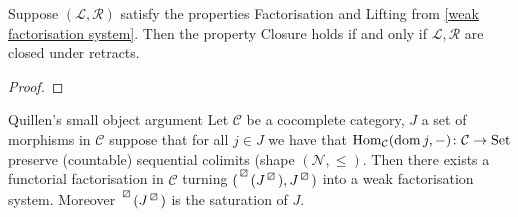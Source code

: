 \begin{lem}
    Suppose $(\mathcal{L}, \mathcal{R})$ satisfy the properties Factorisation and Lifting from \cref{weak factorisation system}.
    Then the property Closure holds if and only if $\mathcal{L}, \mathcal{R}$ are closed under retracts.
\end{lem}

\begin{proof}
\end{proof}

\begin{thm}{Quillen's small object argument}
\label{Quillen's small object argument}
    Let $\mathcal{C}$ be a cocomplete category, $J$ a set of morphisms in $\mathcal{C}$ suppose that for all $j \in J$ we have that $\operatorname{Hom}_{\mathcal{C}}(\operatorname{dom} j,-)\colon \mathcal{C} \to \operatorname{Set}$ preserve (countable) sequential colimits (shape $(\mathcal{N}, \leq )$.
    Then there exists a functorial factorisation in $\mathcal{C}$ turning $(\prescript{\lift{}}{}{(J^{\lift{}})},J^{\lift{}})$ into a weak factorisation system.
    Moreover $\prescript{\lift{}}{}{(J^{\lift{}})}$ is the saturation of $J$.
\end{thm}

